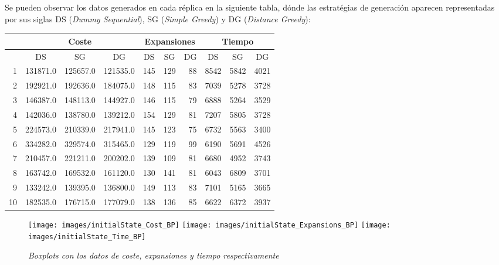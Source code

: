 \documentclass{article}
\begin{document}
\begin{enumerate}
  Se pueden observar los datos generados en cada réplica en la siguiente tabla, dónde las estratégias de generación aparecen representadas por sus siglas DS (\textit{Dummy Sequential}), SG (\textit{Simple Greedy}) y DG (\textit{Distance Greedy}):
  \begin{center}
    \begin{tabular}{ | r | r | r | r | r | r | r | r | r | r | }
      \hline
      \rowcolor{DarkGrey}
      & \multicolumn{3}{|c|}{Coste} & \multicolumn{3}{c|}{Expansiones} & \multicolumn{3}{|c|}{Tiempo} \\ \hline
      \rowcolor{DarkGrey}
      \multicolumn{1}{|c|}{Réplica} & \multicolumn{1}{|c|}{DS} & \multicolumn{1}{|c|}{SG} & \multicolumn{1}{|c|}{DG} & \multicolumn{1}{|c|}{DS} & \multicolumn{1}{|c|}{SG} & \multicolumn{1}{|c|}{DG} & \multicolumn{1}{|c|}{DS} & \multicolumn{1}{|c|}{SG} & \multicolumn{1}{|c|}{DG} \\ \hline \hline
      1 & 131871.0 & 125657.0 & 121535.0 & 145 & 129 & 88 & 8542 & 5842 & 4021 \\ \hline
      \rowcolor{LightGrey}
      2 & 192921.0 & 192636.0 & 184075.0 & 148 & 115 & 83 & 7039 & 5278 & 3728 \\ \hline
      3 & 146387.0 & 148113.0 & 144927.0 & 146 & 115 & 79 & 6888 & 5264 & 3529 \\ \hline
      \rowcolor{LightGrey}
      4 & 142036.0 & 138780.0 & 139212.0 & 154 & 129 & 81 & 7207 & 5805 & 3728 \\ \hline
      5 & 224573.0 & 210339.0 & 217941.0 & 145 & 123 & 75 & 6732 & 5563 & 3400 \\ \hline
      \rowcolor{LightGrey}
      6 & 334282.0 & 329574.0 & 315465.0 & 129 & 119 & 99 & 6190 & 5691 & 4526 \\ \hline
      7 & 210457.0 & 221211.0 & 200202.0 & 139 & 109 & 81 & 6680 & 4952 & 3743 \\ \hline
      \rowcolor{LightGrey}
      8 & 163742.0 & 169532.0 & 161120.0 & 130 & 141 & 81 & 6043 & 6809 & 3701 \\ \hline
      9 & 133242.0 & 139395.0 & 136800.0 & 149 & 113 & 83 & 7101 & 5165 & 3665 \\ \hline
      \rowcolor{LightGrey}
      10 & 182535.0 & 176715.0 & 177079.0 & 138 & 136 & 85 & 6622 & 6372 & 3937 \\ \hline
    \end{tabular}
  \end{center}

  \begin{figure}[htp]
    \centering
    \texttt{[image: images/initialState\_Cost\_BP]}\hfill
    \texttt{[image: images/initialState\_Expansions\_BP]}\hfill
    \texttt{[image: images/initialState\_Time\_BP]}
    \caption{\textit{Boxplots con los datos de coste, expansiones y tiempo respectivamente}}
  \end{figure}


\end{enumerate}
\end{document}
